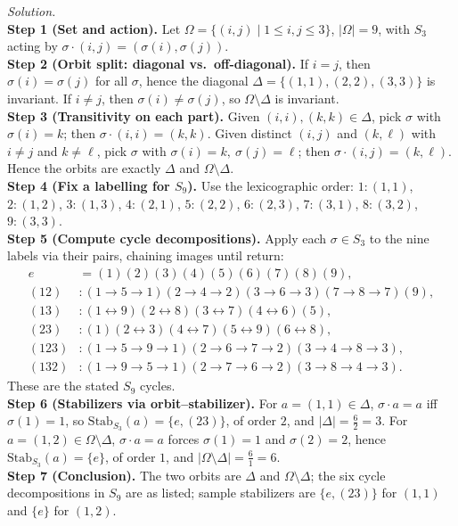 \documentclass[11pt]{article}
\theoremstyle{definition}
\begin{document}
\dotfill

\emph{Solution.}\\
\textbf{Step 1 (Set and action).} Let $\Omega=\{(i,j)\mid 1\le i,j\le 3\}$, $|\Omega|=9$, with $S_3$ acting by $\sigma\!\cdot\!(i,j)=(\sigma(i),\sigma(j))$.\\
\textbf{Step 2 (Orbit split: diagonal vs.\ off-diagonal).} If $i=j$, then $\sigma(i)=\sigma(j)$ for all $\sigma$, hence the diagonal $\Delta=\{(1,1),(2,2),(3,3)\}$ is invariant. If $i\ne j$, then $\sigma(i)\ne \sigma(j)$, so $\Omega\setminus\Delta$ is invariant.\\
\textbf{Step 3 (Transitivity on each part).} Given $(i,i),(k,k)\in\Delta$, pick $\sigma$ with $\sigma(i)=k$; then $\sigma\!\cdot\!(i,i)=(k,k)$. Given distinct $(i,j)$ and $(k,\ell)$ with $i\ne j$ and $k\ne \ell$, pick $\sigma$ with $\sigma(i)=k,\ \sigma(j)=\ell$; then $\sigma\!\cdot\!(i,j)=(k,\ell)$. Hence the orbits are exactly $\Delta$ and $\Omega\setminus\Delta$.\\
\textbf{Step 4 (Fix a labelling for $S_9$).} Use the lexicographic order: $1:(1,1)$, $2:(1,2)$, $3:(1,3)$, $4:(2,1)$, $5:(2,2)$, $6:(2,3)$, $7:(3,1)$, $8:(3,2)$, $9:(3,3)$.\\
\textbf{Step 5 (Compute cycle decompositions).} Apply each $\sigma\in S_3$ to the nine labels via their pairs, chaining images until return:
\[
\begin{aligned}
e&=(1)(2)(3)(4)(5)(6)(7)(8)(9),\\
(12)&:(1\!\to\!5\!\to\!1)(2\!\to\!4\!\to\!2)(3\!\to\!6\!\to\!3)(7\!\to\!8\!\to\!7)(9),\\
(13)&:(1\!\leftrightarrow\!9)(2\!\leftrightarrow\!8)(3\!\leftrightarrow\!7)(4\!\leftrightarrow\!6)(5),\\
(23)&:(1)(2\!\leftrightarrow\!3)(4\!\leftrightarrow\!7)(5\!\leftrightarrow\!9)(6\!\leftrightarrow\!8),\\
(123)&:(1\!\to\!5\!\to\!9\!\to\!1)(2\!\to\!6\!\to\!7\!\to\!2)(3\!\to\!4\!\to\!8\!\to\!3),\\
(132)&:(1\!\to\!9\!\to\!5\!\to\!1)(2\!\to\!7\!\to\!6\!\to\!2)(3\!\to\!8\!\to\!4\!\to\!3).
\end{aligned}
\]
These are the stated $S_9$ cycles.\\
\textbf{Step 6 (Stabilizers via orbit–stabilizer).} For $a=(1,1)\in\Delta$, $\sigma\!\cdot\!a=a$ iff $\sigma(1)=1$, so $\mathrm{Stab}_{S_3}(a)=\{e,(23)\}$, of order $2$, and $|\Delta|=\frac{6}{2}=3$. For $a=(1,2)\in\Omega\setminus\Delta$, $\sigma\!\cdot\!a=a$ forces $\sigma(1)=1$ and $\sigma(2)=2$, hence $\mathrm{Stab}_{S_3}(a)=\{e\}$, of order $1$, and $|\Omega\setminus\Delta|=\frac{6}{1}=6$.\\
\textbf{Step 7 (Conclusion).} The two orbits are $\Delta$ and $\Omega\setminus\Delta$; the six cycle decompositions in $S_9$ are as listed; sample stabilizers are $\{e,(23)\}$ for $(1,1)$ and $\{e\}$ for $(1,2)$.\\
\end{document}
